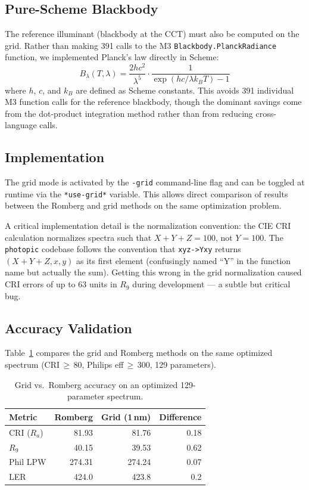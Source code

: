 \documentclass[11pt]{article}
\begin{document}
\subsection{Pure-Scheme Blackbody}

The reference illuminant (blackbody at the CCT) must also be computed
on the grid.  Rather than making 391 calls to the M3
\texttt{Blackbody.PlanckRadiance} function, we implemented Planck's law
directly in Scheme:
\begin{equation}
B_\lambda(T,\lambda) = \frac{2hc^2}{\lambda^5}
  \cdot \frac{1}{\exp(hc/\lambda k_B T) - 1}
\end{equation}
where $h$, $c$, and $k_B$ are defined as Scheme constants.  This
avoids 391 individual M3 function calls for the reference blackbody,
though the dominant savings come from the dot-product integration
method rather than from reducing cross-language calls.

\subsection{Implementation}

The grid mode is activated by the \texttt{-grid} command-line flag and
can be toggled at runtime via the \texttt{*use-grid*} variable.  This
allows direct comparison of results between the Romberg and grid methods
on the same optimization problem.

A critical implementation detail is the normalization convention:
the CIE CRI calculation normalizes spectra such that $X + Y + Z = 100$,
not $Y = 100$.  The \texttt{photopic} codebase follows the convention
that \texttt{xyz->Yxy} returns $(X+Y+Z, x, y)$ as its first element
(confusingly named ``Y'' in the function name but actually the sum).
Getting this wrong in the grid normalization caused CRI errors of up to
63 units in $R_9$ during development --- a subtle but critical bug.

\subsection{Accuracy Validation}

Table~\ref{tab:grid-accuracy} compares the grid and Romberg methods
on the same optimized spectrum (CRI\,$\geq$\,80, Philips eff\,$\geq$\,300,
129 parameters).

\begin{table}[H]
\centering
\caption{Grid vs.\ Romberg accuracy on an optimized 129-parameter spectrum.}
\label{tab:grid-accuracy}
\begin{tabular}{lrrr}
\toprule
Metric & Romberg & Grid (1\,nm) & Difference \\
\midrule
CRI ($R_a$)       & 81.93 & 81.76 & 0.18 \\
$R_9$             & 40.15 & 39.53 & 0.62 \\
Phil LPW          & 274.31 & 274.24 & 0.07 \\
LER               & 424.0 & 423.8 & 0.2 \\
\bottomrule
\end{tabular}
\end{table}
\end{document}
